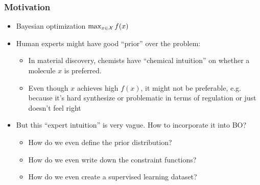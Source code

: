 \documentclass[11pt,usepdftitle=false,aspectratio=169,usenames,dvipsnames,handout]{beamer}
\begin{document}
\setlength{\figwidth}{.9\textwidth}
\setlength{\figheight}{.6\textheight}

\renewcommand{\figurename}{}



\begin{frame}
  \frametitle{Motivation}

  \begin{itemize}
    \item<+-> Bayesian optimization \(\max_{x \in \mathcal{X}} f(x)\)
    \item<+-> Human experts might have good ``prior'' over the problem:
    \begin{itemize}
      \item In material discovery, chemists have ``chemical intuition'' on whether a molecule \(x\) is preferred.
      \item Even though \(x\) achieves high \(f(x)\), it might not be preferable, e.g. because it's hard synthesize or problematic in terms of regulation or just doesn't feel right
    \end{itemize}
    \item<+-> But this ``expert intuition'' is very vague. How to incorporate it into BO?
    \begin{itemize}
      \item How do we even define the prior distribution?
      \item How do we even write down the constraint functions?
      \item How do we even create a supervised learning dataset?
    \end{itemize}
  \end{itemize}
\end{frame}
\end{document}
